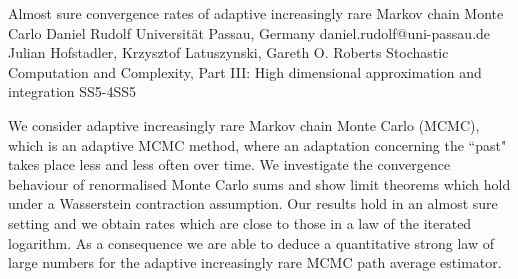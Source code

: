 \begin{talk}
  {Almost sure convergence rates of adaptive increasingly rare Markov chain Monte Carlo}%
  {Daniel Rudolf}%
  {Universit\"at Passau, Germany}%
  {daniel.rudolf@uni-passau.de}%
  {Julian Hofstadler, Krzysztof Latuszynski, Gareth O. Roberts}%
{Stochastic Computation and Complexity, Part III: High dimensional approximation and integration}
{}{SS5-4}{SS5}

			

We consider adaptive increasingly rare Markov chain Monte Carlo (MCMC), which is an adaptive MCMC method, where an adaptation concerning the ``past" takes place less and less often over time. We investigate the convergence behaviour of renormalised Monte Carlo sums and show limit theorems which hold under a Wasserstein contraction assumption. Our results hold in an almost sure setting and we obtain rates which are close to those in a law of the iterated logarithm. As a consequence we are able to deduce a quantitative strong law of large numbers for the adaptive increasingly rare MCMC path average estimator.

\medskip

%
\end{talk}


